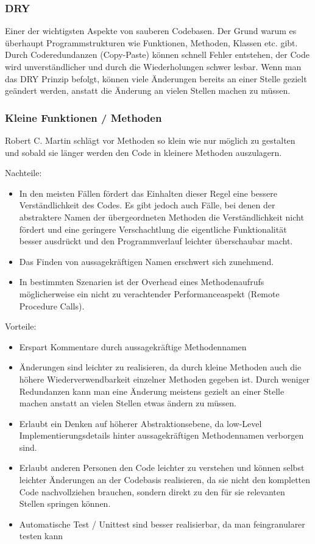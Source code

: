 \subsubsection{DRY}
  
Einer der wichtigsten Aspekte von sauberen Codebasen. Der Grund warum es überhaupt 
Programmstrukturen wie Funktionen, Methoden, Klassen etc. gibt.
Durch Coderedundanzen (Copy-Paste) können schnell Fehler entstehen, der Code
wird unverständlicher und durch die Wiederholungen schwer lesbar.
Wenn man das DRY Prinzip befolgt, können viele Änderungen bereits an
einer Stelle gezielt geändert werden, anstatt die Änderung an vielen Stellen
machen zu müssen.

\subsubsection{Kleine Funktionen / Methoden}

Robert C. Martin schlägt vor Methoden so klein wie nur möglich zu gestalten und sobald 
sie länger werden den Code in kleinere Methoden auszulagern.

\bigskip
Nachteile:
\begin{itemize}
\item In den meisten Fällen fördert das Einhalten dieser Regel eine bessere Verständlichkeit
des Codes. Es gibt jedoch auch Fälle, bei denen der abstraktere Namen der übergeordneten Methoden die Verständlichkeit nicht
fördert und eine geringere Verschachtlung die eigentliche Funktionalität besser
ausdrückt und den Programmverlauf leichter überschaubar macht.
\item Das Finden von aussagekräftigen Namen erschwert sich zunehmend.
\item In bestimmten Szenarien ist der Overhead eines Methodenaufrufs möglicherweise
ein nicht zu verachtender Performanceaspekt (Remote Procedure Calls).
\end{itemize}
\bigskip
Vorteile:
\begin{itemize}
\item Erspart Kommentare durch aussagekräftige Methodennamen
\item Änderungen sind leichter zu realisieren, da durch kleine Methoden auch die
höhere Wiederverwendbarkeit einzelner Methoden gegeben ist. Durch weniger Redundanzen kann man
eine Änderung meistens gezielt an einer Stelle machen anstatt an vielen
Stellen etwas ändern zu müssen.
\item Erlaubt ein Denken auf höherer Abstraktionsebene, da low-Level
Implementierungsdetails hinter aussagekräftigen Methodennamen verborgen sind.
\item Erlaubt anderen Personen den Code leichter zu verstehen und  können selbst
leichter Änderungen an der Codebasis realisieren, da sie nicht den kompletten
Code nachvollziehen brauchen, sondern direkt zu den für sie relevanten Stellen
springen können.
\item Automatische Test / Unittest sind besser realisierbar, da man feingranularer
testen kann
\end{itemize}

